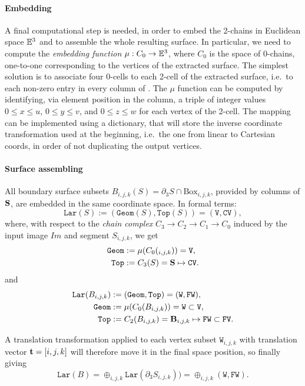 \paragraph{Embedding}
A final computational step is needed, in order to embed the 2-chains in Euclidean space $\mathbb{E}^3$ and to assemble the whole resulting surface. In particular, we need to compute the \emph{embedding function} $\mu : C_0 \to \mathbb{E}^3$, where $C_0$ is the space of 0-chains, one-to-one corresponding to the vertices of the extracted surface. The simplest solution is to associate  four 0-cells to each 2-cell of the extracted surface, i.e.~to each non-zero entry in every column of .  The $\mu$ function  can be computed by identifying, via  element position in the column, a triple of integer values $0\leq x\leq u$, $0\leq y\leq v$, and $0\leq z\leq w$ for each vertex of the 2-cell.  The mapping can be implemented using a dictionary, that will store the inverse coordinate transformation used at the beginning, i.e.~the one from linear to Cartesian coords, in order of not duplicating the output vertices.   

\paragraph{Surface assembling}

All boundary surface subsets $B_{i,j,k}(S) = \partial_3 S \cap \mbox{Box}_{i,j,k}$, provided by  columns of ${\bf S}$, are embedded in the same coordinate space. In formal terms: 
\[
\texttt{Lar}(S) := (\texttt{Geom}(S), \texttt{Top}(S)) = (\texttt{V}, \texttt{CV}),
\]
where, with respect to the \emph{chain complex} $C_3\to C_2\to C_1\to C_0$ induced by the input image $Im$ and segment $S_{i,j,k}$, we get
\begin{align}
\texttt{Geom} &:= \mu(C_0(_{i,j,k})) = \texttt{V},
\\
\texttt{Top} &:= C_3(S) = {\bf S} \mapsto \texttt{CV}.
\end{align}
and
\begin{align}
\texttt{Lar}(B_{i,j,k}) &:= (\texttt{Geom}, \texttt{Top}) = (\texttt{W}, \texttt{FW}),
\\
\texttt{Geom} &:= \mu(C_0(B_{i,j,k})) = \texttt{W} \subset \texttt{V},
\\
\texttt{Top} &:= C_2(B_{i,j,k}) = {\bf B}_{i,j,k} \mapsto \texttt{FW} \subset \texttt{FV}.
\end{align}


A translation transformation applied to each vertex subset $\texttt{W}_{i,j,k}$ with translation  vector ${\bf t} = [i,j,k]$ will therefore move it in the final space position, so finally giving
\[
\texttt{Lar}(B) = \oplus_{i,j,k}\texttt{Lar}(\partial_3 S_{i,j,k})) = \oplus_{i,j,k}(\texttt{W}, \texttt{FW}) .
\]


